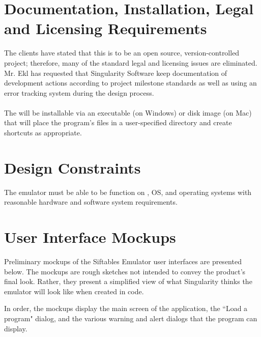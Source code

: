 \documentclass[12pt]{article}
\begin{document}
\section{Documentation, Installation, Legal and Licensing Requirements}
The clients have stated that this is to be an open source, version-controlled project; therefore, many of the standard legal and licensing issues are eliminated. Mr. Ekl has requested that Singularity Software keep documentation of development actions according to project milestone standards as well as using an error tracking system during the design process.\\\\
The  will be installable via an executable (on \gls{Windows}) or disk image (on \gls{Mac}) that will place the program's files in a user-specified directory and create shortcuts as appropriate.

\section{Design Constraints}
The emulator must be able to be function on ,  OS, and  operating systems with reasonable hardware and software system requirements.

\section{User Interface Mockups}
Preliminary mockups of the Siftables Emulator user interfaces are presented below. The mockups are rough sketches not intended to convey the product's final look. Rather, they present a simplified view of what Singularity thinks the emulator will look like when created in code.

In order, the mockups display the main screen of the application, the ``Load a program" dialog, and the various warning and alert dialogs that the program can display.


\end{document}
